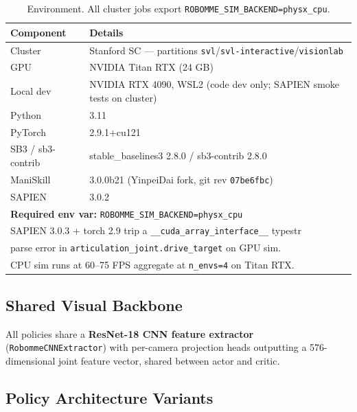 \documentclass[11pt,letterpaper]{article}
\begin{document}
\begin{table}[H]
\centering
\begin{tabular}{ll}
\toprule
\textbf{Component} & \textbf{Details} \\
\midrule
Cluster & Stanford SC — partitions \texttt{svl}/\texttt{svl-interactive}/\texttt{visionlab} \\
GPU & NVIDIA Titan RTX (24 GB) \\
Local dev & NVIDIA RTX 4090, WSL2 (code dev only; SAPIEN smoke tests on cluster) \\
Python & 3.11 \\
PyTorch & 2.9.1+cu121 \\
SB3 / sb3-contrib & stable\_baselines3 2.8.0 / sb3-contrib 2.8.0 \\
ManiSkill & 3.0.0b21 (YinpeiDai fork, git rev \texttt{07be6fbc}) \\
SAPIEN & 3.0.2 \\
\midrule
\multicolumn{2}{l}{\textbf{Required env var:} \texttt{ROBOMME\_SIM\_BACKEND=physx\_cpu}} \\
\multicolumn{2}{l}{SAPIEN 3.0.3 + torch 2.9 trip a \texttt{\_\_cuda\_array\_interface\_\_} typestr} \\
\multicolumn{2}{l}{parse error in \texttt{articulation\_joint.drive\_target} on GPU sim.} \\
\multicolumn{2}{l}{CPU sim runs at 60–75 FPS aggregate at \texttt{n\_envs=4} on Titan RTX.} \\
\bottomrule
\end{tabular}
\caption{Environment. All cluster jobs export \texttt{ROBOMME\_SIM\_BACKEND=physx\_cpu}.}
\end{table}

\subsection{Shared Visual Backbone}

All policies share a \textbf{ResNet-18 CNN feature extractor} (\texttt{RobommeCNNExtractor})
with per-camera projection heads outputting a 576-dimensional joint feature vector,
shared between actor and critic.

\subsection{Policy Architecture Variants}
\end{document}
